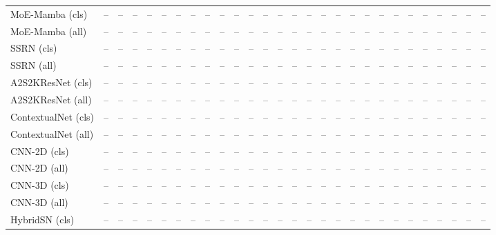 \begin{longtable}{lrrrrrrrrrrrrrrrrrrrrrrrrrrr}
\addlinespace
MoE-Mamba (cls) & -- & -- & -- & -- & -- & -- & -- & -- & -- & -- & -- & -- & -- & -- & -- & -- & -- & -- & -- & -- & -- & -- & -- & -- & -- & -- & --\\*
MoE-Mamba (all) & -- & -- & -- & -- & -- & -- & -- & -- & -- & -- & -- & -- & -- & -- & -- & -- & -- & -- & -- & -- & -- & -- & -- & -- & -- & -- & --\\
\addlinespace
SSRN (cls) & -- & -- & -- & -- & -- & -- & -- & -- & -- & -- & -- & -- & -- & -- & -- & -- & -- & -- & -- & -- & -- & -- & -- & -- & -- & -- & --\\*
SSRN (all) & -- & -- & -- & -- & -- & -- & -- & -- & -- & -- & -- & -- & -- & -- & -- & -- & -- & -- & -- & -- & -- & -- & -- & -- & -- & -- & --\\
\addlinespace
A2S2KResNet (cls) & -- & -- & -- & -- & -- & -- & -- & -- & -- & -- & -- & -- & -- & -- & -- & -- & -- & -- & -- & -- & -- & -- & -- & -- & -- & -- & --\\*
A2S2KResNet (all) & -- & -- & -- & -- & -- & -- & -- & -- & -- & -- & -- & -- & -- & -- & -- & -- & -- & -- & -- & -- & -- & -- & -- & -- & -- & -- & --\\
\addlinespace
ContextualNet (cls) & -- & -- & -- & -- & -- & -- & -- & -- & -- & -- & -- & -- & -- & -- & -- & -- & -- & -- & -- & -- & -- & -- & -- & -- & -- & -- & --\\*
ContextualNet (all) & -- & -- & -- & -- & -- & -- & -- & -- & -- & -- & -- & -- & -- & -- & -- & -- & -- & -- & -- & -- & -- & -- & -- & -- & -- & -- & --\\
\addlinespace
CNN-2D (cls) & -- & -- & -- & -- & -- & -- & -- & -- & -- & -- & -- & -- & -- & -- & -- & -- & -- & -- & -- & -- & -- & -- & -- & -- & -- & -- & --\\*
CNN-2D (all) & -- & -- & -- & -- & -- & -- & -- & -- & -- & -- & -- & -- & -- & -- & -- & -- & -- & -- & -- & -- & -- & -- & -- & -- & -- & -- & --\\
\addlinespace
CNN-3D (cls) & -- & -- & -- & -- & -- & -- & -- & -- & -- & -- & -- & -- & -- & -- & -- & -- & -- & -- & -- & -- & -- & -- & -- & -- & -- & -- & --\\*
CNN-3D (all) & -- & -- & -- & -- & -- & -- & -- & -- & -- & -- & -- & -- & -- & -- & -- & -- & -- & -- & -- & -- & -- & -- & -- & -- & -- & -- & --\\
\addlinespace
HybridSN (cls) & -- & -- & -- & -- & -- & -- & -- & -- & -- & -- & -- & -- & -- & -- & -- & -- & -- & -- & -- & -- & -- & -- & -- & -- & -- & -- & --\\*

\end{longtable}
